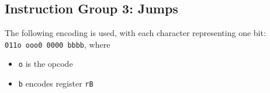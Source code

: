 \documentclass{article}
\begin{document}
\begin{itemize}
	\end{itemize}

	\doublespacing
	\subsection{Instruction Group 3:  Jumps}
	The following encoding is used, with each character representing one
	bit:  \\
	\texttt{011o ooo0 0000 bbbb}, where

	\singlespacing
	\begin{itemize}
		\item \texttt{o} is the opcode
		\item \texttt{b} encodes register \texttt{rB}
	\end{itemize}

	\doublespacing
\end{document}
